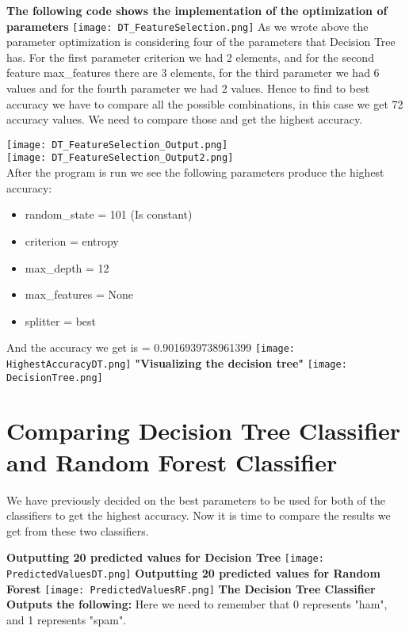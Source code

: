 \documentclass{article}
\begin{document}
 \vspace{1cm}
\textbf{The following code shows the implementation of the optimization of parameters}
\centering
\texttt{[image: DT\_FeatureSelection.png]}
\vspace{1cm}
As we wrote above the parameter optimization is considering four of the parameters that Decision Tree has. For the first parameter criterion we had 2 elements, and for the second feature max\_features there are 3 elements, for the third parameter we had 6 values and for the fourth parameter we had 2 values. Hence to find to best accuracy we have to compare all the possible combinations, in this case we get 72 accuracy values. We need to compare those and get the highest accuracy.

\centering
\texttt{[image: DT\_FeatureSelection\_Output.png]}
\\
\texttt{[image: DT\_FeatureSelection\_Output2.png]}
\\
\vspace{1cm}
 After the program is run we see the following parameters produce the highest accuracy:
 \begin{itemize}
     \item random\_state = 101 (Is constant)
     \item criterion =  entropy 
     \item max\_depth =  12  
     \item max\_features =  None 
     \item splitter =  best
     
 \end{itemize}
And the accuracy we get is = 0.9016939738961399
\texttt{[image: HighestAccuracyDT.png]}
\textbf{"Visualizing the decision tree"}
\texttt{[image: DecisionTree.png]}


\section{Comparing Decision Tree Classifier and Random Forest Classifier}
We have previously decided on the best parameters to be used for both of the classifiers to get the highest accuracy. Now it is time to compare the results we get from these two classifiers. 
\\
\vspace{0.5cm}

\textbf{Outputting 20 predicted values for Decision Tree}
\vspace{0.5cm}
\texttt{[image: PredictedValuesDT.png]}
\textbf{Outputting 20 predicted values for Random Forest}
\vspace{5cm}
\texttt{[image: PredictedValuesRF.png]}
\textbf{The Decision Tree Classifier Outputs the following: }
Here we need to remember that 0 represents "ham", and 1 represents "spam". 
\end{document}

